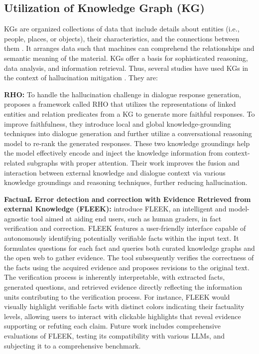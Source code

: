 \documentclass[11pt]{article}
\begin{document}
\subsection{Utilization of Knowledge Graph (KG)}
\label{subsubsec:Utilization of Knowledge Graph (KG)}
KGs are organized collections of data that include details about entities (i.e., people, places, or objects), their characteristics, and the connections between them \cite{sun2023head}. It arranges data such that machines can comprehend the relationships and semantic meaning of the material. KGs offer a basis for sophisticated reasoning, data analysis, and information retrieval. Thus, several studies have used KGs in the context of hallucination mitigation \cite{bayat2023fleek}. They are:

\textbf{RHO:} To handle the hallucination challenge in dialogue response generation, \cite{ji-etal-2023-rho} proposes a framework called RHO that utilizes the representations of linked entities and relation predicates from a KG to generate more faithful responses. To improve faithfulness, they introduce local and global knowledge-grounding techniques into dialogue generation and further utilize a conversational reasoning model to re-rank the generated responses. These two knowledge groundings help the model effectively encode and inject the knowledge information from context-related subgraphs with proper attention. Their work improves the fusion and interaction between external knowledge and dialogue context via various knowledge groundings and reasoning
techniques, further reducing hallucination.

\noindent
\textbf{FactuaL Error detection and correction with Evidence Retrieved from external Knowledge (FLEEK):} \cite{bayat2023fleek} introduce FLEEK, an intelligent and model-agnostic tool aimed at aiding end users, such as human graders, in fact verification and correction. FLEEK features a user-friendly interface capable of autonomously identifying potentially verifiable facts within the input text. It formulates questions for each fact and queries both curated knowledge graphs and the open web to gather evidence. The tool subsequently verifies the correctness of the facts using the acquired evidence and proposes revisions to the original text. The verification process is inherently interpretable, with extracted facts, generated questions, and retrieved evidence directly reflecting the information units contributing to the verification process. For instance, FLEEK would visually highlight verifiable facts with distinct colors indicating their factuality levels, allowing users to interact with clickable highlights that reveal evidence supporting or refuting each claim. Future work includes comprehensive evaluations of FLEEK, testing its compatibility with various LLMs, and subjecting it to a comprehensive benchmark.
\end{document}
